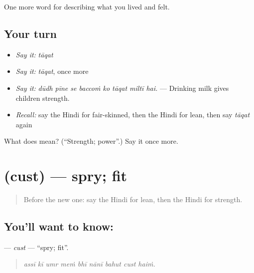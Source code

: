 \begin{grammarlens}[title={What you've built}]
One more word for describing what you lived and felt.
\end{grammarlens}

\subsection*{Your turn}
\begin{itemize}
\raggedright
  \item \emph{Say it:} \emph{tāqat}
  \item \emph{Say it:} \emph{tāqat}, once more
  \item \emph{Say it:} \emph{dūdh pīne se baccoṁ ko tāqat miltī hai.} — Drinking milk gives children strength.
  \item \emph{Recall:} say the Hindi for fair-skinned, then the Hindi for lean, then say \emph{tāqat} again
\end{itemize}

\begin{tcolorbox}[breakable,colback=teal!4,colframe=teal!35!black,title={Before you move on}]
What does  mean? (\textquotedblleft{}Strength; power\textquotedblright{}.) Say it once more.
\end{tcolorbox}
\section[\texorpdfstring{\hi{चुस्त} (cust)}{चुस्त (cust)}]{ (cust) — spry; fit}

\label{lesson:HI-C483-cust}



\begin{quote}
Before the new one: say the Hindi for lean, then the Hindi for strength.
\end{quote}

\subsection*{You'll want to know: }
\textbf{} — \emph{cust} — \textquotedblleft{}spry; fit\textquotedblright{}.

\begin{quote}
        
\end{quote}

\begin{quote}
\emph{assī kī umr meṁ bhī nānī bahut cust haiṁ.}
\end{quote}

